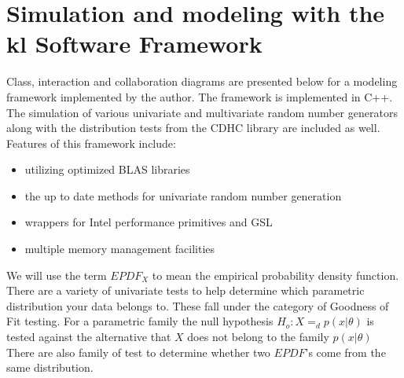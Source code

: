 \section{Simulation and modeling with the kl Software
Framework}Class, interaction and collaboration diagrams are presented below for a modeling framework implemented by the author. The framework is implemented in C++.  The simulation of various univariate and multivariate random number generators along with the distribution tests from the CDHC library are included as well.
Features of this framework include:
\begin{itemize}
\item utilizing optimized BLAS libraries
\item the up to date methods for univariate random number generation
\item wrappers for Intel performance primitives and GSL
\item multiple memory management facilities
\end{itemize}
We will use the term $EPDF_X$ to mean the empirical probability density function. There are a variety of univariate tests to help determine which parametric distribution your data belongs to. These fall under the category of Goodness of Fit testing. For a parametric family the null hypothesis $H_o : X=_d p(x| \theta)$ is tested against the alternative that $X$ does not belong to the family $p(x|\theta)$ There are also family of test to determine whether two $EPDF$'s come from the same distribution. 